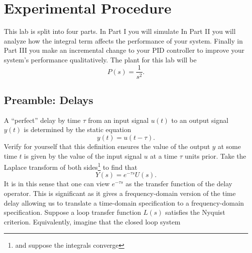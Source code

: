 \section{Experimental Procedure}\label{Lab:4:Experiment}
This lab is split into four parts.
In Part I you will simulate 
In Part II you will analyze how the integral term affects the performance of your system.
Finally in Part III you make an incremental change to your PID controller to improve your system's performance qualitatively.
The plant for this lab will be
\[
  P(s) = \frac{1}{s^2}.
\]

\subsection{Preamble: Delays}
A ``perfect'' delay by time \(\tau\) from an input signal \(u(t)\) to an output signal \(y(t)\) is determined by the static equation
\[
  y(t) = u(t - \tau).
\]
Verify for yourself that this definition ensures the value of the output \(y\) at some time \(t\) is given by the value of the input signal \(u\) at a time \(\tau\) units prior.
Take the Laplace transform of both sides\footnote{and suppose the integrals converge} to find that
\[
  Y(s) = e^{-\tau s} U(s).
\]
It is in this sense that one can view \(e^{-\tau s}\) as the transfer function of the delay operator.
This is significant as it gives a frequency-domain version of the time delay allowing us to translate a time-domain specification to a frequency-domain specification.
%
Suppose a loop transfer function \(L(s)\) satisfies the Nyquist criterion.
Equivalently, imagine that the closed loop system
%
\begin{center}
\end{center}
